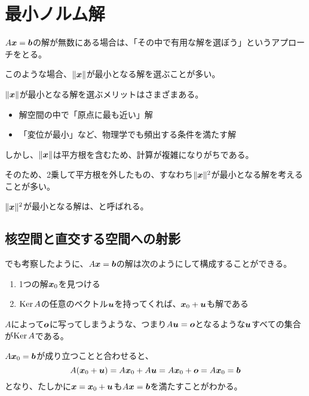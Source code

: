 \documentclass[../../../topic_linear-algebra]{subfiles}
\begin{document}
\sectionline
\section{最小ノルム解}

$A\vb*{x} = \vb*{b}$の解が無数にある場合は、「その中で有用な解を選ぼう」というアプローチをとる。

このような場合、$\| \vb*{x} \|$が最小となる解を選ぶことが多い。

\br

$\| \vb*{x} \|$が最小となる解を選ぶメリットはさまざまある。
\begin{itemize}
  \item 解空間の中で「原点に最も近い」解
  \item 「変位が最小」など、物理学でも頻出する条件を満たす解
\end{itemize}

しかし、$\| \vb*{x} \|$は平方根を含むため、計算が複雑になりがちである。

\br

そのため、2乗して平方根を外したもの、すなわち$\| \vb*{x} \|^2$が最小となる解を考えることが多い。

$\| \vb*{x} \|^2$が最小となる解は、と呼ばれる。

\subsection{核空間と直交する空間への射影}

でも考察したように、$A\vb*{x} = \vb*{b}$の解は次のようにして構成することができる。

\begin{enumerate}
  \item 1つの解$\vb*{x}_0$を見つける
  \item $\operatorname{Ker} A$の任意のベクトル$\vb*{u}$を持ってくれば、$\vb*{x}_0 + \vb*{u}$も解である
\end{enumerate}

\br

\begin{handout}
  $A$によって$\vb*{o}$に写ってしまうような、つまり$A\vb*{u}=\vb*{o}$となるような$\vb*{u}$すべての集合が$\operatorname{Ker} A$である。
  
  \br
  
  $A\vb*{x}_0 = \vb*{b}$が成り立つことと合わせると、
  \begin{equation*}
    A(\vb*{x}_0 + \vb*{u}) = A\vb*{x}_0 + A\vb*{u} = A\vb*{x}_0 + \vb*{o} = A\vb*{x}_0 = \vb*{b}
  \end{equation*}
  となり、たしかに$\vb*{x} = \vb*{x}_0 + \vb*{u}$も$A\vb*{x} = \vb*{b}$を満たすことがわかる。
\end{handout}
\end{document}
